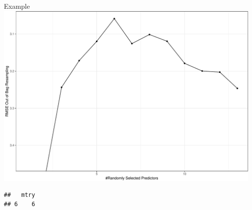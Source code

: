 \documentclass[
  ignorenonframetext,
]{beamer}
\newenvironment{Shaded}{\begin{snugshade}}{\end{snugshade}}
\newcommand{\NormalTok}[1]{#1}
\newcommand{\OperatorTok}[1]{\textcolor[rgb]{0.81,0.36,0.00}{\textbf{#1}}}
\begin{document}
\begin{frame}[fragile]
\begin{block}{Example}
\includegraphics{L7_files/figure-beamer/unnamed-chunk-7-1.pdf}

\begin{Shaded}
\end{Shaded}

\begin{verbatim}
##   mtry
## 6    6
\end{verbatim}

\end{block}

\end{frame}
\end{document}
